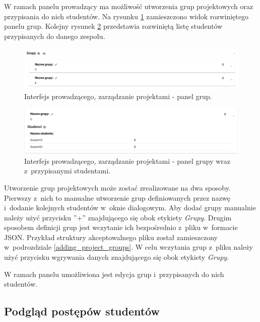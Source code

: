 W ramach panelu prowadzący ma możliwość utworzenia grup projektowych oraz przypisania do nich studentów.
Na rysunku \ref{fig:lecturer_groups} zamieszczono widok rozwiniętego panelu grup.
Kolejny rysunek \ref{fig:lecturer_students_in_group} przedstawia rozwiniętą listę studentów przypisanych do danego zespołu.

\begin{figure}[h]
    \centering
    \includegraphics[width = 16cm]{chapter04/lecturer_groups.png}
    \caption{Interfejs prowadzącego, zarządzanie projektami - panel grup.}
    \label{fig:lecturer_groups}
\end{figure}

\begin{figure}[h]
    \centering
    \includegraphics[width = 16cm]{chapter04/lecturer_students_in_group.png}
    \caption{Interfejs prowadzącego, zarządzanie projektami - panel grupy wraz z~przypisanymi studentami.}
    \label{fig:lecturer_students_in_group}
\end{figure}

Utworzenie grup projektowych może zostać zrealizowane na dwa sposoby.
Pierwszy z~nich to manualne utworzenie grup definiowanych przez nazwę i~dodanie kolejnych studentów w~oknie dialogowym.
Aby dodać grupy manualnie należy użyć przycisku ”+” znajdującego się obok etykiety \textit{Grupy}.
Drugim sposobem definicji grup jest wczytanie ich bezpośrednio z~pliku w~formacie JSON.
Przykład struktury akceptowalnego pliku został zamieszczony w~podrozdziale \ref{adding_project_groups}.
W celu wczytania grup z~pliku należy użyć przycisku wgrywania danych znajdującego się obok etykiety \textit{Grupy}.

W ramach panelu umożliwiona jest edycja grup i~przypisanych do nich studentów.

\subsection{Podgląd postępów studentów}
\label{lecturer_preview}

